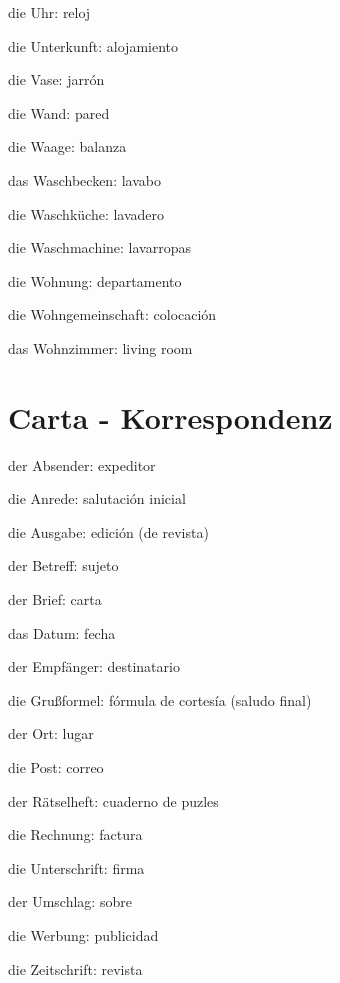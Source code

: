 \begin{multicols}{2}
\begin{myitemize}
\item die Uhr: reloj
\item die Unterkunft: alojamiento
\item die Vase: jarrón
\item die Wand: pared
\item die Waage: balanza
\item das Waschbecken: lavabo
\item die Waschküche: lavadero
\item die Waschmachine: lavarropas
\item die Wohnung: departamento
\item die Wohngemeinschaft: colocación
\item das Wohnzimmer: living room 
\end{myitemize}
\end{multicols}

\section{Carta - Korrespondenz}
\begin{multicols}{2}
\begin{myitemize}
\item der Absender: expeditor
\item die Anrede: salutación inicial
\item die Ausgabe: edición (de revista)
\item der Betreff: sujeto
\item der Brief: carta
\item das Datum: fecha
\item der Empfänger: destinatario
\item die Grußformel: fórmula de cortesía (saludo final)
\item der Ort: lugar
\item die Post: correo
\item der Rätselheft: cuaderno de puzles
\item die Rechnung: factura
\item die Unterschrift: firma
\item der Umschlag: sobre
\item die Werbung: publicidad
\item die Zeitschrift: revista
\end{myitemize}
\end{multicols}

